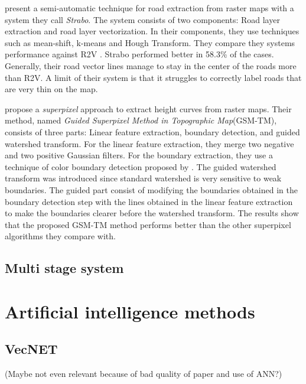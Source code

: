 \citeauthor{Chiang2013}\cite{Chiang2013} present a semi-automatic technique for road extraction from raster maps with a system they call \emph{Strabo}. The system consists of two components: Road layer extraction and road layer vectorization. In their components, they use techniques such as mean-shift, k-means and Hough Transform. They compare they systems performance against R2V \cite{Wu1999}. Strabo performed better in 58.3\% of the cases. Generally, their road vector lines manage to stay in the center of the roads more than R2V. A limit of their system is that it struggles to correctly label roads that are very thin on the map.

\citeauthor{Miao2016}\cite{Miao2016} propose a \emph{superpixel}\cite{Ren2003} approach to extract height curves from raster maps. Their method, named \emph{Guided Superpixel Method in Topographic Map}(GSM-TM), consists of three parts: Linear feature extraction, boundary detection, and guided watershed transform. For the linear feature extraction, they merge two negative and two positive Gaussian filters. For the boundary extraction, they use a technique of color boundary detection proposed by \citeauthor{Yang2013}\cite{Yang2013}. The guided watershed transform was introduced since standard watershed is very sensitive to weak boundaries. The guided part consist of modifying the boundaries obtained in the boundary detection step with the lines obtained in the linear feature extraction to make the boundaries clearer before the watershed transform. The results show that the proposed GSM-TM method performs better than the other superpixel algorithms they compare with.


\subsection{Multi stage system}
\cite{Oka2012}


\section{Artificial intelligence methods}

\subsection{VecNET}
(Maybe not even relevant because of bad quality of paper and use of ANN?)

